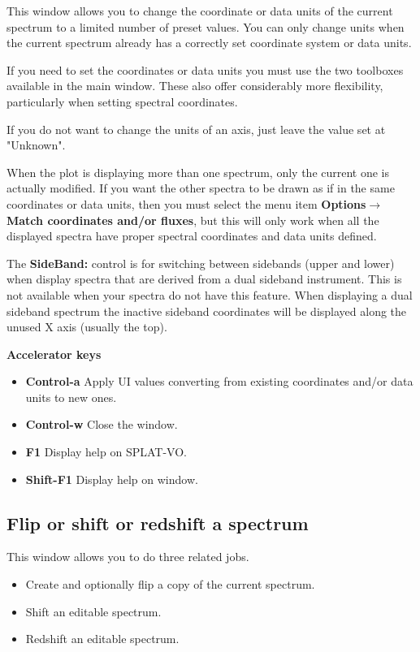 \documentclass[twoside,11pt]{article}
\newcommand{\latexhtml}[2]{#1}
\renewcommand{\_}{\texttt{\symbol{95}}}
\newcommand{\SPLAT}{\textsf{SPLAT-VO}}
\newcommand{\submenuitem}[2]{\latexhtml{\textbf{#1$\rightarrow$#2}}{\textbf{#1->#2}}}
\newcommand{\labelitem}[1]{\textbf{#1}}
\newcommand{\subheading}[1]{\textbf{\large{#1}}}
\begin{document}
This window allows you to change the coordinate or data units of the current
spectrum to a limited number of preset values. You can only change units when
the current spectrum already has a correctly set coordinate system or data
units.

If you need to set the coordinates or data units you must use the two
toolboxes available in the main window. These also offer considerably more
flexibility, particularly when setting spectral coordinates.

If you do not want to change the units of an axis, just leave the value set at
"Unknown".

When the plot is displaying more than one spectrum, only the current one is
actually modified. If you want the other spectra to be drawn as if in the same
coordinates or data units, then you must select the menu item
\submenuitem{Options}{Match coordinates and/or fluxes}, but this will only
work when all the displayed spectra have proper spectral coordinates and data
units defined.

The \labelitem{SideBand:} control is for switching between sidebands (upper
and lower) when display spectra that are derived from a dual sideband
instrument. This is not available when your spectra do not have this feature.
When displaying a dual sideband spectrum the inactive sideband coordinates
will be displayed along the unused X axis (usually the top).

\subheading{Accelerator keys}

\begin{itemize}
\item \labelitem{Control-a} Apply UI values converting from existing
coordinates and/or data units to new ones.
 
\item \labelitem{Control-w} Close the window.
\item \labelitem{F1} Display help on \SPLAT.     
\item \labelitem{Shift-F1} Display help on window.
\end{itemize}


\newpage
\subsection{Flip or shift or redshift a spectrum}

This window allows you to do three related jobs.
\begin{itemize}
\item Create and optionally flip a copy of the current spectrum.
\item Shift an editable spectrum.
\item Redshift an editable spectrum.
\end{itemize}
\end{document}

